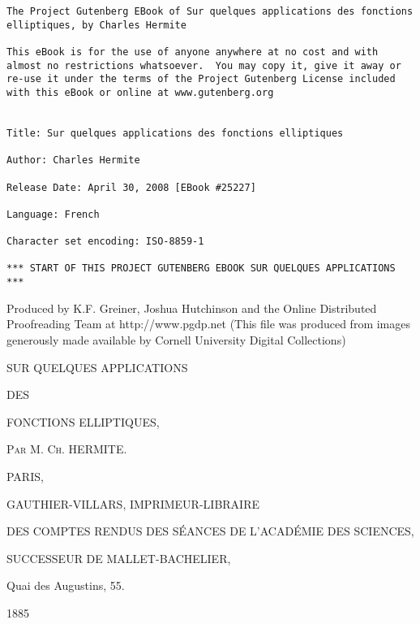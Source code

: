\documentclass[11pt,leqno,oneside,letterpaper]{book}[2005/09/16]
\begin{document}
\frontmatter
\thispagestyle{empty}
{\small
\begin{verbatim}
The Project Gutenberg EBook of Sur quelques applications des fonctions
elliptiques, by Charles Hermite

This eBook is for the use of anyone anywhere at no cost and with
almost no restrictions whatsoever.  You may copy it, give it away or
re-use it under the terms of the Project Gutenberg License included
with this eBook or online at www.gutenberg.org


Title: Sur quelques applications des fonctions elliptiques

Author: Charles Hermite

Release Date: April 30, 2008 [EBook #25227]

Language: French

Character set encoding: ISO-8859-1

*** START OF THIS PROJECT GUTENBERG EBOOK SUR QUELQUES APPLICATIONS ***
\end{verbatim}}
\clearpage
\thispagestyle{empty}
\null\vfil
\begin{center}
Produced by K.F. Greiner, Joshua Hutchinson and the Online
Distributed Proofreading Team at http://www.pgdp.net (This
file was produced from images generously made available
by Cornell University Digital Collections)
\end{center}
\vfil\clearpage
\thispagestyle{empty}
\begin{center}
\vspace{1cm}
{\LARGE SUR QUELQUES APPLICATIONS}
\bigskip\bigskip

{\large DES}
\bigskip\bigskip

{\Huge FONCTIONS ELLIPTIQUES,}

\bigskip\bigskip\bigskip\bigskip\bigskip\bigskip

\textsc{\LARGE Par M. Ch. HERMITE.}

\vfill

{\LARGE PARIS,}
\bigskip\bigskip

GAUTHIER-VILLARS, IMPRIMEUR-LIBRAIRE

DES COMPTES RENDUS DES S\'EANCES DE L'ACAD\'EMIE DES SCIENCES,
\bigskip

SUCCESSEUR DE MALLET-BACHELIER,

Quai des Augustins, 55.

\bigskip\bigskip

{\LARGE 1885}
\vspace{1cm}
\end{center}
\end{document}
